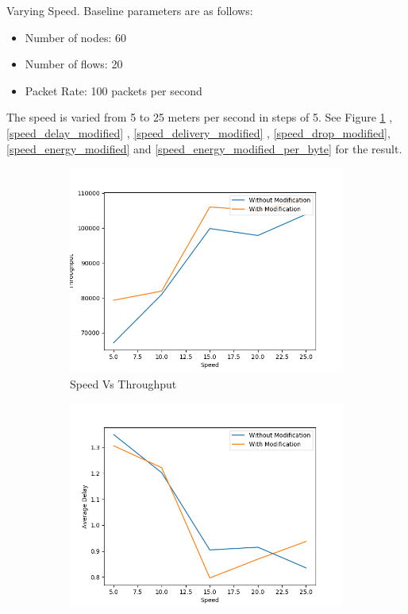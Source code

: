 Varying Speed.
Baseline parameters are as follows:
\begin{itemize}
    \item Number of nodes: 60
    \item Number of flows: 20
    \item Packet Rate: 100 packets per second
\end{itemize}
The speed is varied from 5 to 25 meters per second in steps of 5.
See Figure \ref{speed_throughput_modified} ,\ref{speed_delay_modified} , \ref{speed_delivery_modified} , \ref{speed_drop_modified}, \ref{speed_energy_modified} and \ref{speed_energy_modified_per_byte}  for the result.
\begin{figure}[h]
\begin{subfigure}{.5\textwidth}
  \centering
  \includegraphics[width=.8\linewidth]{modified_fig/SpeedvsThroughput.png}
     \caption{Speed Vs Throughput}
    \label{speed_throughput_modified}
\end{subfigure}
\begin{subfigure}{.5\textwidth}
  \centering
  \includegraphics[width=.8\linewidth]{modified_fig/SpeedvsAverageDelay.png}

\end{subfigure}
\end{figure}
